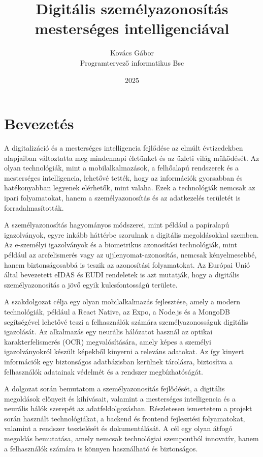 \documentclass[
]{thesis-ekf}
\theoremstyle{definition}
\theoremstyle{remark}
\begin{document}
	
	\title{Digitális személyazonosítás mesterséges intelligenciával}
	\author{Kovács Gábor\\Programtervező informatikus Bsc}
	\date{2025}
	\maketitle
	
	\tableofcontents
	
	\chapter*{Bevezetés}
	
	A digitalizáció és a mesterséges intelligencia fejlődése az elmúlt évtizedekben alapjaiban változtatta meg mindennapi életünket és az üzleti világ működését. Az olyan technológiák, mint a mobilalkalmazások, a felhőalapú rendszerek és a mesterséges intelligencia, lehetővé tették, hogy az információk gyorsabban és hatékonyabban legyenek elérhetők, mint valaha. Ezek a technológiák nemcsak az ipari folyamatokat, hanem a személyazonosítás és az adatkezelés területét is forradalmasították.
	
	A személyazonosítás hagyományos módszerei, mint például a papíralapú igazolványok, egyre inkább háttérbe szorulnak a digitális megoldásokkal szemben. Az e-személyi igazolványok és a biometrikus azonosítási technológiák, mint például az arcfelismerés vagy az ujjlenyomat-azonosítás, nemcsak kényelmesebbé, hanem biztonságosabbá is teszik az azonosítási folyamatokat. Az Európai Unió által bevezetett eIDAS és EUDI rendeletek is azt mutatják, hogy a digitális személyazonosítás a jövő egyik kulcsfontosságú területe.
	
	A szakdolgozat célja egy olyan mobilalkalmazás fejlesztése, amely a modern technológiák, például a React Native, az Expo, a Node.js és a MongoDB segítségével lehetővé teszi a felhasználók számára személyazonosságuk digitális igazolását. Az alkalmazás egy neurális hálózatot használ az optikai karakterfelismerés (OCR) megvalósítására, amely képes a személyi igazolványokról készült képekből kinyerni a releváns adatokat. Az így kinyert információk egy biztonságos adatbázisban kerülnek tárolásra, biztosítva a felhasználók adatainak védelmét és a rendszer megbízhatóságát.
	
	A dolgozat során bemutatom a személyazonosítás fejlődését, a digitális megoldások előnyeit és kihívásait, valamint a mesterséges intelligencia és a neurális hálók szerepét az adatfeldolgozásban. Részletesen ismertetem a projekt során használt technológiákat, a backend és frontend fejlesztési folyamatokat, valamint a rendszer tesztelését és dokumentálását. A cél egy olyan átfogó megoldás bemutatása, amely nemcsak technológiai szempontból innovatív, hanem a felhasználók számára is könnyen használható és biztonságos.\cite{projektGithub}
	
\end{document}
